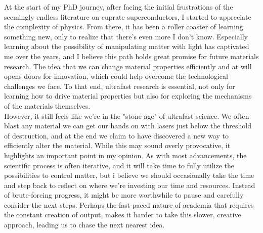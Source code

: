 \newpage

At the start of my PhD journey, after facing the initial frustrations of the seemingly endless literature on cuprate superconductors, I started to appreciate the complexity of physics.
From there, it has been a roller coaster of learning something new, only to realize that there’s even more I don’t know.
Especially learning about the possibility of manipulating matter with light has captivated me over the years, and I believe this path holds great promise for future materials research.
The idea that we can change material properties efficiently and at will opens doors for innovation, which could help overcome the technological challenges we face.
To that end, ultrafast research is essential, not only for learning how to drive material properties but also for exploring the mechanisms of the materials themselves.\\
However, it still feels like we're in the "stone age" of ultrafast science.
We often blast any material we can get our hands on with lasers just below the threshold of destruction, and at the end we claim to have discovered a new way to efficiently alter the material.
While this may sound overly provocative, it highlights an important point in my opinion.
As with most advancements, the scientific process is often iterative, and it will take time to fully utilize the possibilities to control matter, but i believe we should occasionally take the time and step back to reflect on where we’re investing our time and resources.
Instead of brute-forcing progress, it might be more worthwhile to pause and carefully consider the next steps.
Perhaps the fast-paced nature of academia that requires the constant creation of output, makes it harder to take this slower, creative approach, leading us to chase the next nearest idea.\hfill\break

